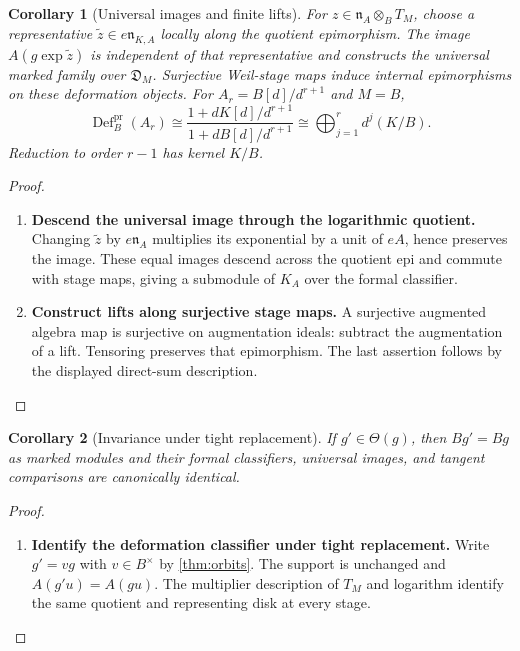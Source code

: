 \documentclass[11pt,a4paper]{article}
\numberwithin{algorithm}{section}
\numberwithin{equation}{section}
\newtheorem{corollary}[corollary]{Corollary}
\theoremstyle{definition}
\theoremstyle{remark}
\theoremstyle{plain}
\theoremstyle{definition}
\theoremstyle{plain}
\begin{document}
\begin{corollary}[Universal images and finite lifts]
\label{cor:formal-resource-lifts}
For $z\in\mathfrak n_A\otimes_BT_M$, choose a representative
$\widetilde z\in e\mathfrak n_{K,A}$ locally along the quotient
epimorphism. The image $A(g\exp\widetilde z)$ is independent of
that representative and constructs the universal marked family
over $\mathfrak D_M$. Surjective Weil-stage maps induce internal
epimorphisms on these deformation objects. For
$A_r=B[d]/d^{r+1}$ and $M=B$,
\begin{equation}\label{eq:formal-truncated-moduli}
 \operatorname{Def}^{\mathrm{pr}}_B(A_r)
 \cong\frac{1+dK[d]/d^{r+1}}{1+dB[d]/d^{r+1}}
 \cong\bigoplus_{j=1}^r d^j(K/B).
\end{equation}
Reduction to order $r-1$ has kernel $K/B$.
\end{corollary}
\begin{proof}\leavevmode
\begin{enumerate}[leftmargin=*,align=left]
\item \textbf{Descend the universal image through the logarithmic quotient.}
Changing $\widetilde z$ by $e\mathfrak n_A$ multiplies its
exponential by a unit of $eA$, hence preserves the image.
These equal images descend across the quotient epi and commute
with stage maps, giving a submodule of $K_A$ over the formal
classifier.

\item \textbf{Construct lifts along surjective stage maps.}
A surjective augmented algebra map is surjective
on augmentation ideals: subtract the augmentation of a lift.
Tensoring preserves that epimorphism. The last assertion follows
by the displayed direct-sum description.
\end{enumerate}
\end{proof}

\begin{corollary}[Invariance under tight replacement]
\label{cor:formal-tight-invariance}
If $g'\in\Theta(g)$, then $Bg'=Bg$ as marked modules and their
formal classifiers, universal images, and tangent comparisons
are canonically identical.
\end{corollary}
\begin{proof}\leavevmode
\begin{enumerate}[leftmargin=*,align=left]
\item \textbf{Identify the deformation classifier under tight replacement.}
Write $g'=vg$ with $v\in B^\times$ by \cref{thm:orbits}.
The support is unchanged and $A(g'u)=A(gu)$. The multiplier
description of $T_M$ and logarithm identify the same quotient
and representing disk at every stage.
\end{enumerate}
\end{proof}
\end{document}
